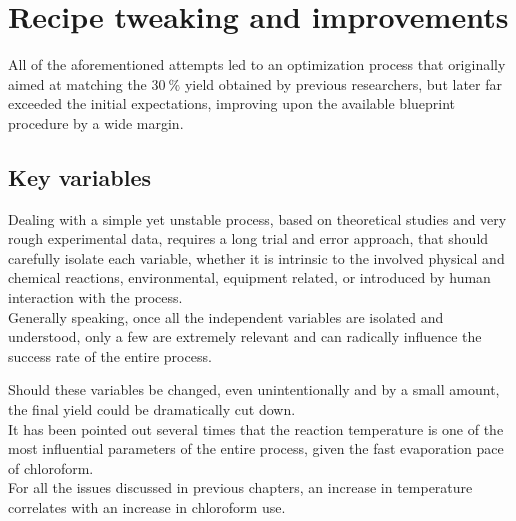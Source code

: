 \documentclass{article}
\begin{document}




    \clearpage

    \section{Recipe tweaking and improvements\label{recipe_improvement}}

    All of the aforementioned attempts led to an optimization process that originally aimed at 
    matching the $30 \ \%$ yield obtained by previous researchers, but later far exceeded the 
    initial expectations, improving upon the available blueprint procedure by a wide margin. 


        \subsection{Key variables\label{key_variables}}

        Dealing with a simple yet unstable process, based on theoretical studies and very rough experimental data, requires a
        long trial and error approach, that should carefully isolate each variable, whether it is intrinsic to the 
        involved physical and chemical reactions, environmental, equipment related, or introduced by human 
        interaction with the process. \\ 

        Generally speaking, once all the independent variables are isolated and understood, only a few are extremely relevant and can 
        radically influence the success rate of the entire process. 

        Should these variables be changed, even unintentionally and by a small amount, the final yield
        could be dramatically cut down. \\ 

        It has been pointed out several times that the reaction temperature is one of the most 
        influential parameters of the entire process, given the fast evaporation pace of chloroform. \\  

        For all the issues discussed in previous chapters, an increase in temperature correlates with an increase in 
        chloroform use. 
 
\end{document}

